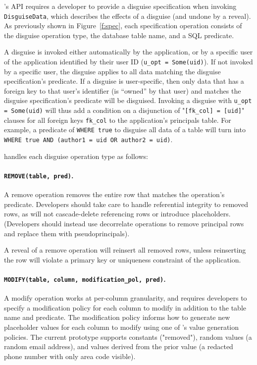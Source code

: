 \sys's API requires a developer to provide a disguise specification when
invoking \texttt{DisguiseData}, which describes the effects of a disguise (and
undone by a reveal).  As previously shown in Figure~\ref{f:spec}, each
specification operation consists of the disguise operation type, the database
table name, and a SQL  predicate.
%

%
A disguise is invoked either automatically by the application, or by a specific
user of the application identified by their user ID (\texttt{u\_opt =
Some(uid)}).
% 
If not invoked by a specific user, the disguise applies to all data matching the
disguise specification's predicate.
%
If a disguise is user-specific, then only data that has a foreign key to that
user's identifier (is ``owned'' by that user) and matches the disguise
specification's predicate will be disguised. Invoking a disguise with
\texttt{u\_opt = Some(uid)} will thus add a condition on a disjunction of
"\texttt{[fk\_col] = [uid]}" clauses for all foreign keys \texttt{fk\_col} to
the application's principals table. For example, a predicate of \texttt{WHERE
true} to disguise all data of a table will turn into \texttt{WHERE true AND
(author1 = uid OR author2 = uid)}.

\sys handles each disguise operation type as follows:
%

\paragraph{\texttt{REMOVE(table, pred)}.}
A remove operation removes the entire row that matches the operation's
predicate.
%
Developers should take care to handle referential integrity to removed rows, as
\sys will not cascade-delete referencing rows or introduce placeholders.
(Developers should instead use decorrelate operations to remove principal rows
and replace them with pseudoprincipals).
%

%
A reveal of a remove operation will reinsert all removed rows, unless
reinserting the row will violate a primary key or uniqueness constraint of the
application.
%

%
\paragraph{\texttt{MODIFY(table, column, modification\_pol, pred)}.}
A modify operation works at per-col\-umn granularity, and requires developers to
specify a modification policy for each column to modify in addition to the table
name and predicate.
%
The modification policy informs \sys how to generate new placeholder values for
each column to modify using one of \sys's value generation policies. The current
prototype supports constants (\eg "removed"), random values (\eg a random email
address), and values derived from the prior value (\eg a redacted phone number
with only area code visible).
%

